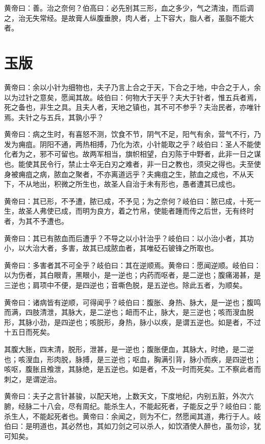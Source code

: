 \documentclass[a4paper,12pt,UTF8,twoside]{ctexbook}
\begin{document}
	黄帝曰：善。治之奈何？伯高曰：必先别其三形，血之多少，气之清浊，而后调之，治无失常经。是故膏人纵腹垂腴，肉人者，上下容大，脂人者，虽脂不能大者。
	\chapter{玉版}
	
	黄帝曰：余以小针为细物也，夫子乃言上合之于天，下合之于地，中合之于人，余以为过针之意矣，愿闻其故。岐伯曰：何物大于天乎？夫大于针者，惟五兵者焉，死之备也，非生之具。且夫人者，天地之镇也，其不可不参乎？夫治民者，亦唯针焉。夫针之与五兵，其孰小乎？
	
	黄帝曰：病之生时，有喜怒不测，饮食不节，阴气不足，阳气有余，营气不行，乃发为痈疽。阴阳不通，两热相搏，乃化为浓，小针能取之乎？岐伯曰：圣人不能使化者为之，邪不可留也。故两军相当，旗帜相望，白刃陈于中野者，此非一日之谋也。能使其民令行，禁止士卒无白刃之难者，非一日之教也，须臾之得也。夫至使身被痈疽之病，脓血之聚者，不亦离道远乎？夫痈疽之生，脓血之成也，不从天下，不从地出，积微之所生也，故圣人自治于未有形也，愚者遭其已成也。
	
	黄帝曰：其已形，不予遭，脓已成，不予见；为之奈何？岐伯曰：脓已成，十死一生，故圣人弗使已成，而明为良方，着之竹帛，使能者踵而传之后世，无有终时者，为其不予遭也。
	
	黄帝曰：其已有脓血而后遭乎？不导之以小针治乎？岐伯曰：以小治小者，其功小，以大治大者，多害，故其已成脓血者，其唯砭石铍锋之所取也。
	
	黄帝曰：多害者其不可全乎？岐伯曰：其在逆顺焉。黄帝曰：愿闻逆顺。岐伯曰：以为伤者，其白眼青，黑眼小，是一逆也；内药而呕者，是二逆也；腹痛渴甚，是三逆也；肩项中不便，是四逆也；音嘶色脱，是五逆也。除此五者，为顺矣。
	
	黄帝曰：诸病皆有逆顺，可得闻乎？岐伯曰：腹胀、身热、脉大，是一逆也；腹鸣而满，四肢清泄，其脉大，是二逆也；衄而不止，脉大，是三逆也；咳而溲血脱形，其脉小劲，是四逆也；咳脱形，身热，脉小以疾，是谓五逆也。如是者，不过十五日而死矣。
	
	其腹大胀，四末清，脱形，泄甚，是一逆也；腹胀便血，其脉大，时绝，是二逆也；咳溲血，形肉脱，脉搏，是三逆也；呕血，胸满引背，脉小而疾，是四逆也；咳呕，腹胀且飧泄，其脉绝，是五逆也。如是者，不及一时而死矣。工不察此者而刺之，是谓逆治。
	
	黄帝曰：夫子之言针甚骏，以配天地，上数天文，下度地纪，内别五脏，外次六腑，经脉二十八会，尽有周纪。能杀生人，不能起死者，子能反之乎？岐伯曰：能杀生人，不能起死者也。黄帝曰：余闻之，则为不仁，然愿闻其道，弗行于人。岐伯曰：是明道也，其必然也，其如刀剑之可以杀人，如饮酒使人醉也，虽勿诊，犹可知矣。
	
\end{document}
